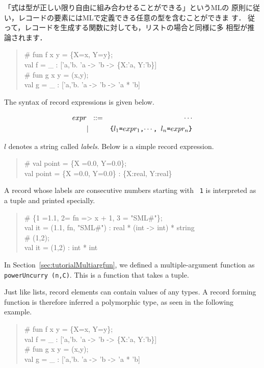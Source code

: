\documentclass{jbook}
\newenvironment{program}{\begin{tt}\begin{quote}}{\end{quote}\end{tt}}
\begin{document}
	「式は型が正しい限り自由に組み合わせることができる」というMLの
原則に従い，レコードの要素にはMLで定義できる任意の型を含むことができま
す．
	従って，レコードを生成する関数に対しても，リストの場合と同様に多
相型が推論されます．
\begin{program}
\# fun f x y = \{X=x, Y=y\};\\
val f = \_ : ['a,'b. 'a -> 'b -> \{X:'a, Y:'b\}]\\
\# fun g x y = (x,y);\\
val g = \_ : ['a,'b. 'a -> 'b -> 'a * 'b]
\end{program}
\else%
	The syntax of record expressions is given below.
\begin{tt}
\begin{eqnarray*}
expr &\mbox{\ \ }::=& \cdots \\
     &|& \mbox{\tt \{$l_1$=$expr_1$,$\cdots$, $l_n$=$expr_n$\}}
\end{eqnarray*}
\end{tt}
	$l$ denotes a string called {\em labels}.
	Below is a simple record expression.
\begin{program}
\# val point = \{X =0.0, Y=0.0\};\\
val point = \{X =0.0, Y=0.0\} : \{X:real, Y:real\}
\end{program}
	A record whose labels are consecutive numbers starting with {\tt
1} is interpreted as a tuple and printed specially.
\begin{program}
\#  \{1 =1.1, 2= fn => x + 1, 3 = "SML\#"\};\\
val it = (1.1, fn, "SML\#") : real * (int -> int) * string\\
\# (1,2);\\
val it = (1,2) : int * int
\end{program}
	In Section~\ref{sec:tutorialMultiargfun}, we defined a
multiple-argument function as {\tt powerUncurry (n,C)}.
	This is a function that takes a tuple.

	Just like lists, record elements can contain values of any
types.
	A record forming function is therefore inferred a polymorphic
type, as seen in the following example.
\begin{program}
\# fun f x y = \{X=x, Y=y\};\\
val f = \_ : ['a,'b. 'a -> 'b -> \{X:'a, Y:'b\}]\\
\# fun g x y = (x,y);\\
val g = \_ : ['a,'b. 'a -> 'b -> 'a * 'b]
\end{program}
\fi%
\end{document}
